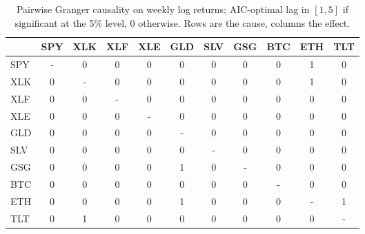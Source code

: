 \begin{table}[H]
\centering
\small
\begin{tabular}{lcccccccccc}
\toprule
 & SPY & XLK & XLF & XLE & GLD & SLV & GSG & BTC & ETH & TLT \\
\midrule
SPY & - & 0 & 0 & 0 & 0 & 0 & 0 & 0 & 1 & 0 \\
XLK & 0 & - & 0 & 0 & 0 & 0 & 0 & 0 & 1 & 0 \\
XLF & 0 & 0 & - & 0 & 0 & 0 & 0 & 0 & 0 & 0 \\
XLE & 0 & 0 & 0 & - & 0 & 0 & 0 & 0 & 0 & 0 \\
GLD & 0 & 0 & 0 & 0 & - & 0 & 0 & 0 & 0 & 0 \\
SLV & 0 & 0 & 0 & 0 & 0 & - & 0 & 0 & 0 & 0 \\
GSG & 0 & 0 & 0 & 0 & 1 & 0 & - & 0 & 0 & 0 \\
BTC & 0 & 0 & 0 & 0 & 0 & 0 & 0 & - & 0 & 0 \\
ETH & 0 & 0 & 0 & 0 & 1 & 0 & 0 & 0 & - & 1 \\
TLT & 0 & 1 & 0 & 0 & 0 & 0 & 0 & 0 & 0 & - \\
\bottomrule
\end{tabular}
\caption{Pairwise Granger causality on weekly log returns; AIC-optimal lag in $[1,5]$ if significant at the 5\% level, 0 otherwise. Rows are the cause, columns the effect.}
\label{tab:returns_weekly}
\end{table}